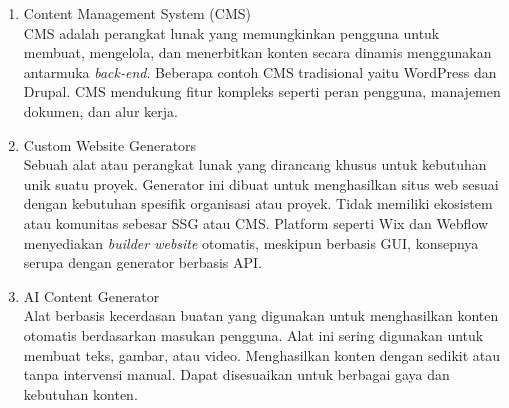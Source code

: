 \begin{enumerate}[label*=\arabic*.,ref=\arabic*]
\begin{enumerate}[label=\alph*.]
            \item Content Management System (CMS) \\
            CMS adalah perangkat lunak yang memungkinkan pengguna untuk membuat, mengelola, dan menerbitkan konten secara dinamis menggunakan antarmuka \textit{back-end}. Beberapa contoh CMS tradisional yaitu WordPress dan Drupal. CMS mendukung fitur kompleks seperti peran pengguna, manajemen dokumen, dan alur kerja. 

            \item Custom Website Generators \\
            Sebuah alat atau perangkat lunak yang dirancang khusus untuk kebutuhan unik suatu proyek. Generator ini dibuat untuk menghasilkan situs web sesuai dengan kebutuhan spesifik organisasi atau proyek. Tidak memiliki ekosistem atau komunitas sebesar SSG atau CMS. Platform seperti Wix dan Webflow menyediakan \textit{builder website} otomatis, meskipun berbasis GUI, konsepnya serupa dengan generator berbasis API.

            \item AI Content Generator \\
            Alat berbasis kecerdasan buatan yang digunakan untuk menghasilkan konten otomatis berdasarkan masukan pengguna. Alat ini sering digunakan untuk membuat teks, gambar, atau video. Menghasilkan konten dengan sedikit atau tanpa intervensi manual. Dapat disesuaikan untuk berbagai gaya dan kebutuhan konten. 
        \end{enumerate}
\end{enumerate}
